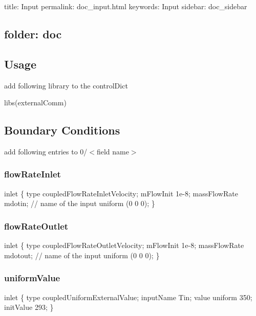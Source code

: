 

 title\+: Input permalink\+: doc\+\_\+input.\+html keywords\+: Input sidebar\+: doc\+\_\+sidebar \subsection*{folder\+: doc }

\subsection*{Usage}

add following library to the control\+Dict


\begin{DoxyCode}
libs(externalComm)
\end{DoxyCode}


\subsection*{Boundary Conditions}

add following entries to 0/$<$field name$>$

\subsubsection*{flow\+Rate\+Inlet}


\begin{DoxyCode}
inlet
\{
    type coupledFlowRateInletVelocity;
    mFlowInit    1e-8;
    massFlowRate mdotin; // name of the input
    uniform (0 0 0);
\}
\end{DoxyCode}


\subsubsection*{flow\+Rate\+Outlet}


\begin{DoxyCode}
inlet
\{
    type coupledFlowRateOutletVelocity;
    mFlowInit    1e-8;
    massFlowRate mdotout; // name of the input
    uniform (0 0 0);
\}
\end{DoxyCode}


\subsubsection*{uniform\+Value}


\begin{DoxyCode}
inlet
\{
    type coupledUniformExternalValue;
    inputName Tin;
    value uniform 350;
    initValue 293;
\}
\end{DoxyCode}


